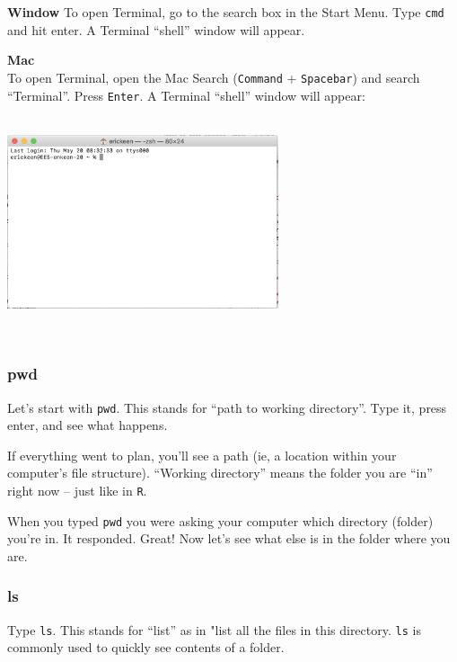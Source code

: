 \documentclass[
]{book}
\begin{document}
\textbf{Window}
To open Terminal, go to the search box in the Start Menu. Type \texttt{cmd} and hit enter. A Terminal ``shell'' window will appear.

\textbf{Mac}\\
To open Terminal, open the Mac Search (\texttt{Command} + \texttt{Spacebar}) and search ``Terminal''. Press \texttt{Enter}. A Terminal ``shell'' window will appear:

~\\

\includegraphics[width=0.6\textwidth,height=\textheight]{img/bash-mac.png}

~

\hypertarget{pwd}{%
\subsubsection*{pwd}\label{pwd}}

Let's start with \texttt{pwd}. This stands for ``path to working directory''. Type it, press enter, and see what happens.

If everything went to plan, you'll see a path (ie, a location within your computer's file structure). ``Working directory'' means the folder you are ``in'' right now -- just like in \texttt{R}.

When you typed \texttt{pwd} you were asking your computer which directory (folder) you're in. It responded. Great! Now let's see what else is in the folder where you are.

\hypertarget{ls}{%
\subsubsection*{ls}\label{ls}}

Type \texttt{ls}. This stands for ``list'' as in "list all the files in this directory. \texttt{ls} is commonly used to quickly see contents of a folder.
\end{document}
